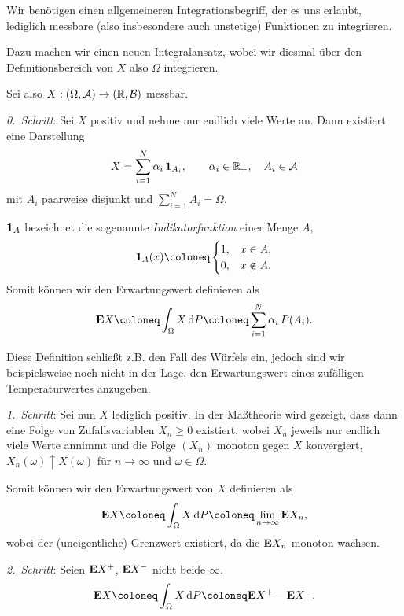 Wir benötigen einen allgemeineren Integrationsbegriff, der es uns erlaubt,
lediglich messbare (also insbesondere auch unstetige) Funktionen zu
integrieren.

Dazu machen wir einen neuen Integralansatz, wobei wir diesmal über den
Definitionsbereich von $X$ also $\Omega$ integrieren.

Sei also $X: (\Omega,\mathcal{A})\to (\mathbb{R},\mathcal{B})$ messbar.

\textit{0.\ Schritt}: Sei $X$ positiv und nehme nur endlich viele
Werte an. Dann existiert eine Darstellung
\begin{align*}
X= \sum\limits^{N}_{i=1} \alpha _{i}\,\mathbf{1} _{A_{i}},\qquad
\alpha_{i} \in \mathbb{R}_+,\quad A_{i} \in \mathcal{A}
\end{align*}
mit $A_i$ paarweise disjunkt und $\sum^{N}_{i=1} A_{i} = \Omega $.

$\mathbf{1}_A$ bezeichnet die sogenannte \emph{Indikatorfunktion} einer Menge $A$,
\begin{align*}
\Id_A(x) \defl
\begin{cases}
1, & x\in A,\\
0, & x\notin A.
\end{cases}
\end{align*}
Somit können wir den Erwartungswert definieren als
\begin{align*}
\E X\defl \int_{\Omega} X\dP\defl \sum\limits^{N}_{i=1} \alpha_{i}\, P(A_{i}).
\end{align*}

Diese Definition schließt z.B. den Fall des Würfels ein, jedoch sind wir
beispielsweise noch nicht in der Lage, den Erwartungswert eines zufälligen 
Temperaturwertes anzugeben.

\textit{1.\ Schritt}: Sei nun $X$ lediglich positiv. In der Maßtheorie wird
gezeigt, dass dann eine Folge von Zufallsvariablen $X_{n} \geq 0$ existiert,
wobei $X_n$ jeweils nur endlich viele Werte annimmt und die Folge $(X_n)$
monoton gegen $X$ konvergiert, $X_{n}(\omega) \uparrow X(\omega)$ für $n
\to \infty$ und $\omega \in \Omega$.

Somit können wir den Erwartungswert von $X$ definieren als
\begin{align*}
\E X \defl \int_{\Omega}X\dP \defl \lim\limits_{n \to
\infty }\E X_{n},
\end{align*}
wobei der (uneigentliche) Grenzwert existiert, da die $\textbf{E} X_n$ monoton wachsen. 

\textit{2.\ Schritt}: Seien $\textbf{E} X^{+}$, $\textbf{E} X^{-}$ nicht beide $\infty$.
\begin{align*}
\E X\defl\int_{\Omega } X\dP\defl \E X^{+} - \E X^{-}.
\end{align*}

